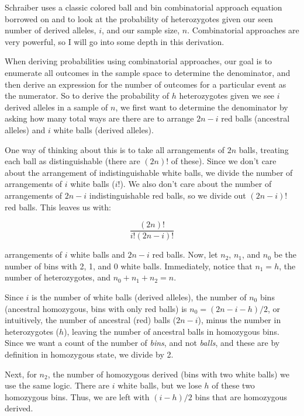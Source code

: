 \documentclass[12pt]{article}\usepackage[]{graphicx}\usepackage[]{color}
\begin{document}
Schraiber uses a classic colored ball and bin combinatorial approach
equation borrowed on \cite{Levene:1949va} and \cite{Haldane:1954ts} to
look at the probability of heterozygotes given our seen number of
derived alleles, $i$, and our sample size, $n$. Combinatorial
approaches are very powerful, so I will go into some depth in this
derivation.

When deriving probabilities using combinatorial approaches, our goal
is to enumerate all outcomes in the sample space to determine the
denominator, and then derive an expression for the number of outcomes
for a particular event as the numerator. So to derive the probability
of $h$ heterozygotes given we see $i$ derived alleles in a sample of
$n$, we first want to determine the denominator by asking how many
total ways are there are to arrange $2n - i$ red balls (ancestral
alleles) and $i$ white balls (derived alleles). 

One way of thinking about this is to take all arrangements of $2n$
balls, treating each ball as distinguishable (there are $(2n)!$ of
these). Since we don't care about the arrangement of indistinguishable
white balls, we divide the number of arrangements of $i$ white balls
($i!$). We also don't care about the number of arrangements of $2n -
i$ indistinguishable red balls, so we divide out $(2n - i)!$ red
balls. This leaves us with:

\begin{equation} \label{eq:01}
\frac{(2n)!}{i! (2n - i)!}
\end{equation}

arrangements of $i$ white balls and $2n - i$ red balls. Now, let
$n_2$, $n_1$, and $n_0$ be the number of bins with 2, 1, and 0 white
balls. Immediately, notice that $n_1 = h$, the number of
heterozygotes, and $n_0 + n_1 + n_2 = n$.

Since $i$ is the number of white balls (derived alleles), the number
of $n_0$ bins (ancestral homozygous, bins with only red balls) is $n_0
= (2n - i - h)/2$, or intuitively, the number of ancestral (red) balls
($2n - i$), minus the number in heterozygotes ($h$), leaving the
number of ancestral balls in homozygous bins. Since we want a count of
the number of \emph{bins}, and not \emph{balls}, and these are by
definition in homozygous state, we divide by 2.

Next, for $n_2$, the number of homozygous derived (bins with two white
balls) we use the same logic. There are $i$ white balls, but we lose
$h$ of these two homozygous bins. Thus, we are left with $(i - h)/2$
bins that are homozygous derived.
\end{document}
